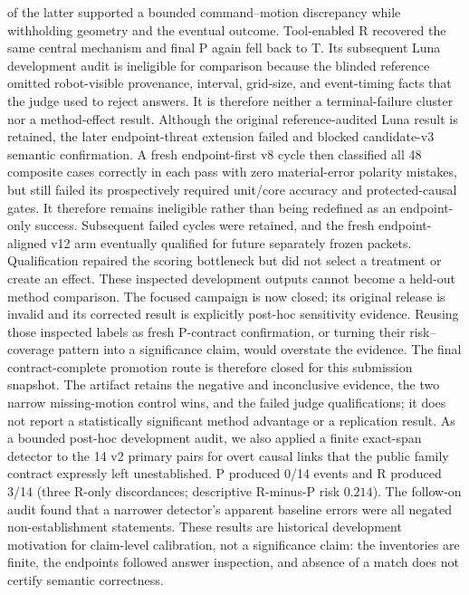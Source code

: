 \documentclass[conference]{IEEEtran}
\begin{document}
of the latter supported a bounded command--motion discrepancy while withholding geometry and the
eventual outcome. Tool-enabled R recovered the same central mechanism and final P again fell back
to T. Its subsequent Luna development audit is ineligible for comparison because the blinded
reference omitted robot-visible provenance, interval, grid-size, and event-timing facts that the
judge used to reject answers. It is therefore neither a terminal-failure cluster nor a
method-effect result.
Although the original reference-audited Luna result is retained, the later endpoint-threat
extension failed and blocked candidate-v3 semantic confirmation. A fresh endpoint-first v8 cycle
then classified all 48 composite cases correctly in each pass with zero material-error polarity
mistakes, but still failed its prospectively required unit/core accuracy and protected-causal
gates. It therefore remains ineligible rather than being redefined as an endpoint-only success.
Subsequent failed cycles were retained, and the fresh endpoint-aligned v12 arm eventually qualified
for future separately frozen packets. Qualification repaired the scoring bottleneck but did not
select a treatment or create an effect. These inspected development
outputs cannot become a held-out method comparison. The focused campaign is now closed; its
original release is invalid and its corrected result is explicitly post-hoc sensitivity evidence.
Reusing those inspected labels as fresh P-contract confirmation, or turning their risk--coverage
pattern into a significance claim, would overstate the evidence.
The final contract-complete promotion route is therefore closed for this submission snapshot. The
artifact retains the negative and inconclusive evidence, the two narrow missing-motion control
wins, and the failed judge qualifications; it does not report a statistically significant method
advantage or a replication result.
As a bounded post-hoc development audit, we also applied a finite exact-span detector to the 14
v2 primary pairs for overt causal links that the public family contract expressly left
unestablished. P produced 0/14 events and R produced 3/14 (three R-only discordances; descriptive
R-minus-P risk $0.214$). The follow-on audit found that a narrower detector's apparent baseline
errors were all negated non-establishment statements. These results are historical development
motivation for claim-level calibration, not a significance claim: the inventories are finite, the
endpoints followed answer inspection, and absence of a match does not certify semantic correctness.
\end{document}

